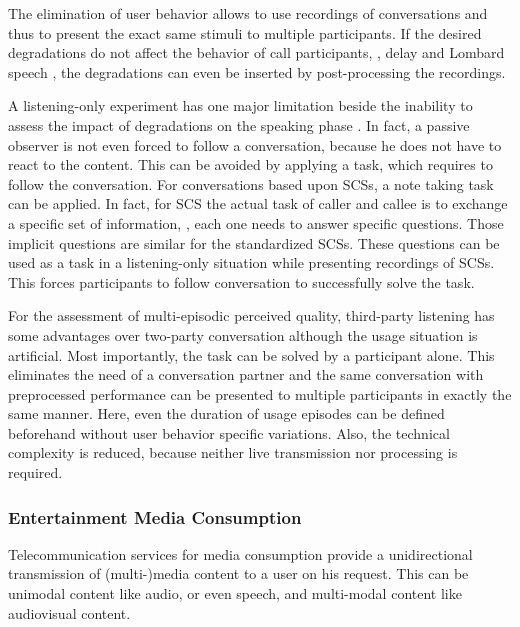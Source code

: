 The elimination of user behavior allows to use recordings of conversations and thus to present the exact same stimuli to multiple participants.
If the desired degradations do not affect the behavior of call participants, \eg, delay and Lombard speech \citep[][p.~161]{moller_assessment_2000}, the degradations can even be inserted by post-processing the recordings.

A listening-only experiment has one major limitation beside the inability to assess the impact of degradations on the speaking phase \citep{gueguin_evaluation_2008}.
In fact, a passive observer is not even forced to follow a conversation, because he does not have to react to the content.
This can be avoided by applying a task, which requires to follow the conversation.
For conversations based upon \acp{SCS}, a note taking task can be applied.
In fact, for \ac{SCS} the actual task of caller and callee is to exchange a specific set of information, \ie, each one needs to answer specific questions.
Those implicit questions are similar for the standardized \acp{SCS}.
These questions can be used as a task in a listening-only situation while presenting recordings of \acp{SCS}.
This forces participants to follow conversation to successfully solve the task.

For the assessment of multi-episodic perceived quality, third-party listening has some advantages over two-party conversation although the usage situation is artificial.
Most importantly, the task can be solved by a participant alone.
This eliminates the need of a conversation partner and the same conversation with preprocessed performance can be presented to multiple participants in exactly the same manner.
Here, even the duration of usage episodes can be defined beforehand without user behavior specific variations.
Also, the technical complexity is reduced, because neither live transmission nor processing is required.

\subsubsection*{Entertainment Media Consumption}
Telecommunication services for media consumption provide a unidirectional transmission of (multi-)media content to a user on his request.
This can be unimodal content like audio, or even speech, and multi-modal content like audiovisual content.

